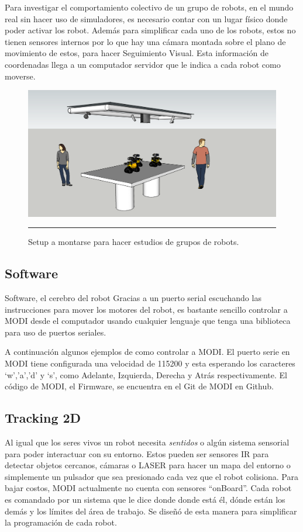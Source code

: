 Para investigar el comportamiento colectivo de un grupo de robots, en el mundo real sin hacer uso de simuladores, es necesario contar con un lugar físico donde poder activar los robot. Además para simplificar cada uno de los robots, estos no tienen sensores internos por lo que hay una cámara montada sobre el plano de movimiento de estos, para hacer Seguimiento Visual. Esta información de coordenadas llega a un computador servidor que le indica a cada robot como moverse.
\begin{figure}[htbp]
	\centering
		\includegraphics[width=\textwidth]{./Figures/setup.png}
		\rule{35em}{0.5pt}
	\caption[Setup Enjambre MODI]{Setup a montarse para hacer estudios de grupos de robots.}
	\label{fig:setup}
\end{figure}
\FloatBarrier

\subsection{Software}
Software, el cerebro del robot
Gracias a un puerto serial escuchando las instrucciones para mover los motores del robot, es bastante sencillo controlar a MODI desde el computador usando cualquier lenguaje que tenga una biblioteca para uso de puertos seriales.

A continuación algunos ejemplos de como controlar a MODI. El puerto serie en MODI tiene configurada una velocidad de 115200 y esta esperando los caracteres ‘w’,’a’,’d’ y ‘s’, como Adelante, Izquierda, Derecha y Atrás respectivamente. El código de MODI, el Firmware, se encuentra en el Git de MODI en Github.


\subsection{Tracking 2D}
Al igual que los seres vivos un robot necesita \textit{sentidos} o algún sistema sensorial para poder interactuar con su entorno. Estos pueden ser sensores IR para detectar objetos cercanos, cámaras o LASER para hacer un mapa del entorno o simplemente un pulsador que sea presionado cada vez que el robot colisiona. Para bajar costos, MODI actualmente no cuenta con sensores “onBoard”. Cada robot es comandado por un sistema que le dice donde donde está él, dónde están los demás y los límites del área de trabajo. Se diseñó de esta manera para simplificar la programación de cada robot.


